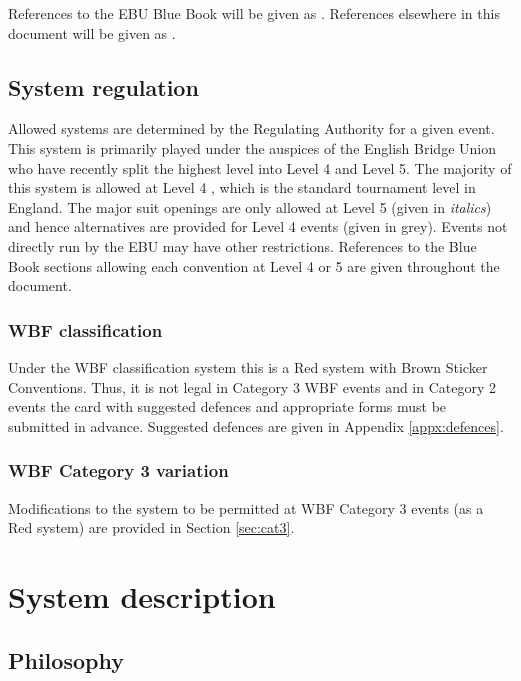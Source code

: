 \documentclass[a4paper,14pt]{extarticle}
\begin{document}
References to the EBU Blue Book will be given as . References
elsewhere in this document will be given as .

\subsection{System regulation}

Allowed systems are determined by the Regulating Authority for a given event.
This system is primarily played under the auspices of the English Bridge Union
who have recently split the highest level into Level 4 and Level 5. The
majority of this system is allowed at Level 4 , which is the
standard tournament level in England. The major suit openings are only allowed
at Level 5  (given in {\it italics}) and hence alternatives are
provided for Level 4 events (given in {\color{CadetBlue}grey}).  Events not
directly run by the EBU may have other restrictions.  References to the Blue
Book sections allowing each convention at Level 4 or 5 are given throughout the
document.

\subsubsection{WBF classification}

Under the WBF classification system this is a Red system with Brown Sticker
Conventions. Thus, it is not legal in Category 3 WBF events and in Category 2
events the card with suggested defences and appropriate forms must be submitted
in advance. Suggested defences are given in Appendix \ref{appx:defences}.

\subsubsection{WBF Category 3 variation}

Modifications to the system to be permitted at WBF Category 3 events (as a Red
system) are provided in Section \ref{sec:cat3}.

\newpage

\section{System description}
\label{sec:system}

\subsection{Philosophy}
\label{sec:philosophy}
\end{document}
